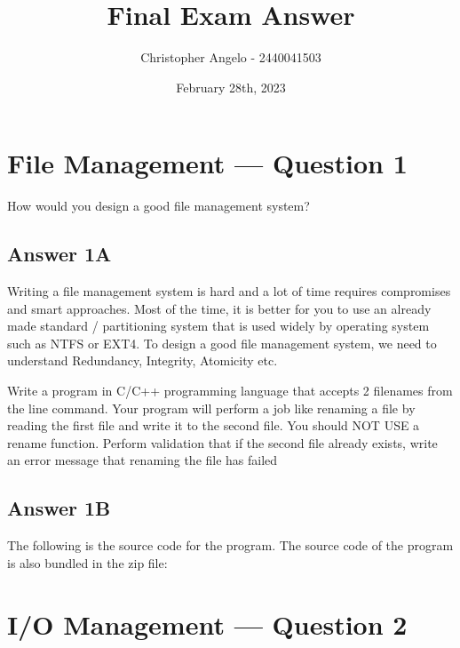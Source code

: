 \documentclass[
  11pt, %
]{assignment}
\author{Christopher Angelo - 2440041503}
\institute{BINUS University\\ Global Class}
\date{February 28th, 2023}
\title{Final Exam Answer}
\begin{document}
\maketitle


\section*{File Management --- Question 1}

\begin{problem}
How would you design a good file management system?
\end{problem}

\subsection*{Answer 1A}

Writing a file management system is hard and a lot of time requires compromises and smart approaches. Most of the time, it is better for you to use an already made standard / partitioning system that is used widely by operating system such as NTFS or EXT4. To design a good file management system, we need to understand Redundancy, Integrity, Atomicity etc.

\begin{problem}
Write a program in C/C++ programming language that accepts 2 filenames from the line command. Your program will perform a job like renaming a file by reading the first file and write it to the second file. You should NOT USE a rename function. Perform validation that if the second file already exists, write an error message that renaming the file has failed
\end{problem}

\subsection*{Answer 1B}

The following is the source code for the program. The source code of the program is also bundled in the zip file:



\section*{I/O Management --- Question 2}
\end{document}
